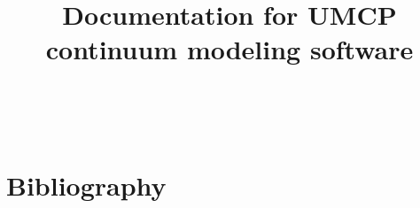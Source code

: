 \documentclass[11pt]{article}
\begin{document}




\title{ Documentation for UMCP continuum modeling software}

\maketitle

\tableofcontents

\clearpage





~\cite{Feng2006}















\section{Bibliography}

\end{document}

